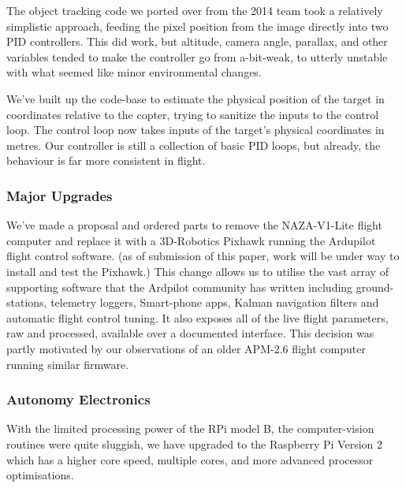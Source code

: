 \documentclass[a4paper, 11pt, titlepage]{article}
\begin{document}
      The object tracking code we ported over from the 2014 team took a relatively simplistic approach, feeding the pixel position from the image directly into two PID controllers.  This did work, but altitude, camera angle, parallax, and other variables tended to make the controller go from a-bit-weak, to utterly unstable with what seemed like minor environmental changes.

      We've built up the code-base to estimate the physical position of the target in coordinates relative to the copter, trying to sanitize the inputs to the control loop. The control loop now takes inputs of the target's physical coordinates in metres.  Our controller is still a collection of basic PID loops, but already, the behaviour is far more consistent in flight.

    \subsubsection{Major Upgrades}
      We've made a proposal and ordered parts to remove the NAZA-V1-Lite flight computer and replace it with a 3D-Robotics Pixhawk \cite{3dr-pixhawk} running the Ardupilot flight control software.  (as of submission of this paper, work will be under way to install and test the Pixhawk.)
      This change allows us to utilise the vast array of supporting software that the Ardpilot community has written including ground-stations, telemetry loggers, Smart-phone apps, Kalman navigation filters and automatic flight control tuning.  It also exposes all of the live flight parameters, raw and processed, available over a documented interface.  This decision was partly motivated by our observations of an older APM-2.6 flight computer running similar firmware.

    \subsubsection{Autonomy Electronics}
      With the limited processing power of the RPi model B, the computer-vision routines were quite sluggish, we have upgraded to the Raspberry Pi Version 2 which has a higher core speed, multiple cores, and more advanced processor optimisations.
\end{document}
